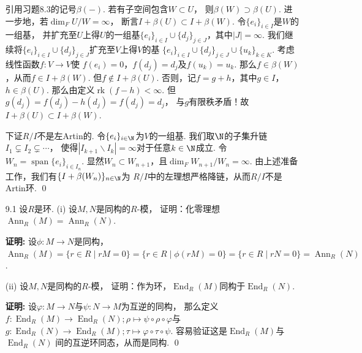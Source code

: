 \begin{enumerate}
            引用习题8.3的记号$\beta(-)$. 若有子空间包含$W \subset U$，
            则$\beta(W) \supset \beta(U)$. 
            进一步地，若$\dim_{F}U/W = \infty$，
            断言$I + \beta(U) \subset I + \beta(W)$.
            令$\{e_{i}\}_{i \in I}$是$W$的一组基，
            并扩充至$U$上得$U$的一组基$\{e_{i}\}_{i \in I} \cup
            \{d_{j}\}_{j \in J}$，其中$|J| = \infty$. 
            我们继续将$\{e_{i}\}_{i \in I} \cup
            \{d_{j}\}_{j \in J}$扩充至$V$上得$V$的基
            $\{e_{i}\}_{i \in I} \cup \{d_{j}\}_{j \in J} \cup \{u_{k}\}_{k \in K}$.
            考虑线性函数$f:V \rightarrow V$使
            $f(e_{i})=0$，$f(d_{j})=d_{j}$及$f(u_{k})=u_{k}$.
            那么$f \in \beta(W)$，从而$f \in I + \beta(W)$.
            但$f \notin I + \beta(U)$. 
            否则，记$f = g + h$，其中$g \in I$，$h \in \beta(U)$.
            那么由定义$\operatorname{rk}(f-h) < \infty$.
            但$g(d_{j}) = f(d_{j}) - h(d_{j}) = f(d_{j}) = d_{j}$，
            与$g$有限秩矛盾！故$I + \beta(U) \subset I + \beta(W)$.

            下证$R/I$不是左Artin的. 令$\{e_{i}\}_{i \in \N}$为$V$的一组基.
            我们取$\N$的子集升链$I_{1} \subsetneq I_{2} \subsetneq \cdots$，
            使得$|I_{k+1} \backslash I_{k}| = \infty$对于任意$k \in \N$成立.
            令$W_{n} = \operatorname{span}\{e_{i}\}_{i \in I_{n}}$.
            显然$W_{n} \subset W_{n+1}$，且$\dim_{F}W_{n+1}/W_{n} = \infty$.
            由上述准备工作，我们有$\{I + \beta(W_{n})\}_{n  \in \N}$为
            $R/I$中的左理想严格降链，从而$R/I$不是Artin环. \qed

    \item[9.1] 设$R$是环. (i) 设$M,N$是同构的$R$-模，
        证明：化零理想$\operatorname{Ann}_{R}(M)=\operatorname{Ann}_{R}(N)$.
    \item[\textbf{证明:}]
        设$\phi\colon M\to N$是同构，$\operatorname{Ann}_{R}(M)=\{r\in R\mid rM=0\}
        =\{r\in R\mid \phi(rM)=0\}=\{r\in R\mid rN=0\}=\operatorname{Ann}_{R}(N)$.
    \item[(ii)] 设$M,N$是同构的$R$-模，
        证明：作为环，$\operatorname{End}_{R}(M)$同构于$\operatorname{End}_{R}(N)$.
    \item[\textbf{证明:}]
        设$\varphi:M \rightarrow N$与$\psi:N \rightarrow M$为互逆的同构，
        那么定义$f:\operatorname{End}_{R}(M) \rightarrow \operatorname{End}_{R}(N);
        \rho \mapsto \psi \circ \rho \circ \varphi$与
        $g:\operatorname{End}_{R}(N) \rightarrow \operatorname{End}_{R}(M);
        \tau \mapsto \varphi \circ \tau \circ \psi$. 
        容易验证这是$\operatorname{End}_{R}(M)$与$\operatorname{End}_{R}(N)$
        间的互逆环同态，从而是同构. \qed


\end{enumerate}
